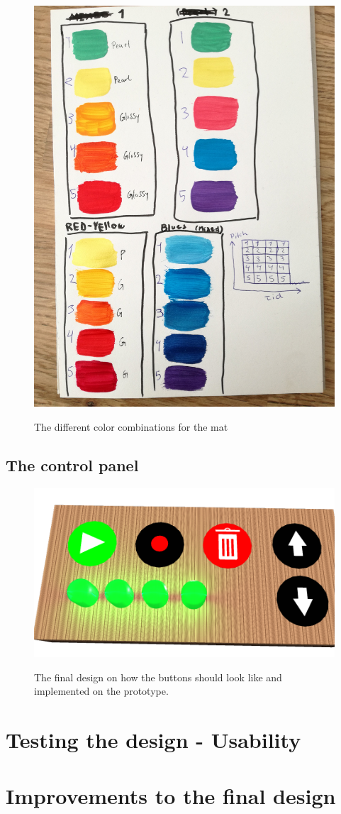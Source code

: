 \begin{figure}[H]
	\centering
	\includegraphics[width=0.5\linewidth]{figure/Design/colors}
	\label{fig:colors}
	\caption{The different color combinations for the mat}	
\end{figure}







\subsection{The control panel}

\begin{figure}[H]
	\centering
	\includegraphics[width=0.7\linewidth]{figure/Design/buttonDesign}
	\label{fig:buttonDesign}
	\caption{The final design on how the buttons should look like and implemented on the prototype.}	
\end{figure}






\section{Testing the design - Usability}

\section{Improvements to the final design}


